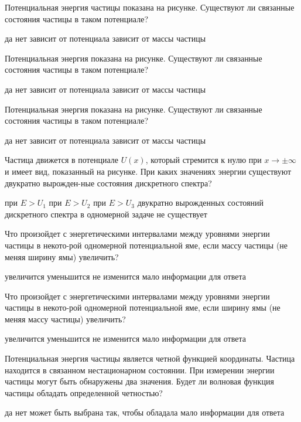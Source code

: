 \documentclass[11pt,a4paper]{exam}
\begin{document}
\begin{questions}
\question Потенциальная энергия частицы показана на рисунке. Существуют ли связанные состояния частицы в таком потенциале?
\begin{choices}
\choice да             
\choice нет
\choice зависит от потенциала      
\choice зависит от массы частицы
\end{choices}

\question Потенциальная энергия показана на рисунке. Существуют ли связанные состояния частицы в таком потенциале?
\begin{choices}
\choice да             
\choice нет
\choice зависит от потенциала      
\choice зависит от массы частицы
\end{choices}

\question Потенциальная энергия показана на рисунке. Существуют ли связанные состояния частицы в таком потенциале?
\begin{choices}
\choice да             
\choice нет
\choice зависит от потенциала      
\choice зависит от массы частицы
\end{choices}

\question Частица движется в потенциале $U(x)$, который стремится к нулю при $x \to  \pm \infty $ и имеет вид, показанный на рисунке. При каких значениях энергии существуют двукратно вырожден-ные состояния дискретного спектра?
\begin{choices}
\choice при $E > {U_1}$         
\choice при $E > {U_2}$         
\choice при $E > {U_3}$   
\choice двукратно вырожденных состояний дискретного спектра в одномерной задаче не существует
\end{choices}

\question Что произойдет с энергетическими интервалами между уровнями энергии частицы в некото-рой одномерной потенциальной яме, если массу частицы (не меняя ширину ямы) увеличить?
\begin{choices}
\choice увеличится     
\choice уменьшится
\choice не изменится      
\choice мало информации для ответа
\end{choices}

\question Что произойдет с энергетическими интервалами между уровнями энергии частицы в некото-рой одномерной потенциальной яме, если ширину ямы (не меняя массу частицы) увеличить?
\begin{choices}
\choice увеличится     
\choice уменьшится
\choice не изменится      
\choice мало информации для ответа
\end{choices}

\question Потенциальная энергия частицы является четной функцией координаты. Частица находится в связанном нестационарном состоянии. При измерении энергии частицы могут быть обнаружены два значения. Будет ли волновая функция частицы обладать определенной четностью?
\begin{choices}
\choice да
\choice нет
\choice может быть выбрана так, чтобы обладала
\choice мало информации для ответа
\end{choices}


\end{questions}
\end{document}

